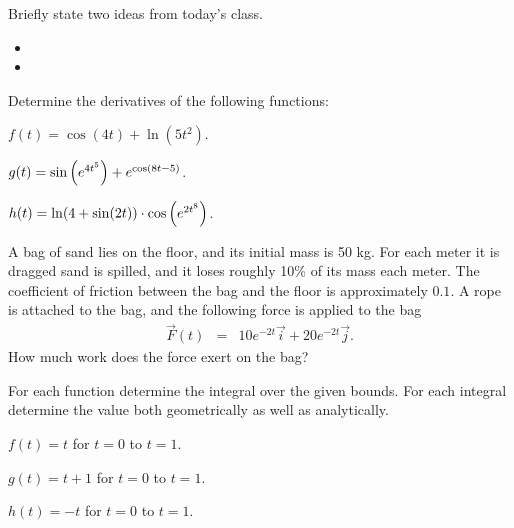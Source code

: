 \begin{problem}
\item Briefly state two ideas from today's class.
  \begin{itemize}
  \item
  \item
  \end{itemize}
\item Determine the derivatives of the following functions:
  \begin{subproblem}
  \item $f(t) = \cos(4t) + \ln(5t^2)$.
    \vfill
  \item $g(t) = \sin\left( e^{4t^5} \right)  + e^{\cos\left( 8t-5 \right)}$.
    \vfill
  \item $h(t) = \ln(4+\sin(2t) ) \cdot \cos \left( e^{2t^8} \right)$.
    \vfill
  \end{subproblem}

  \clearpage

\item A bag of sand lies on the floor, and its initial mass is 50
  kg. For each meter it is dragged sand is spilled, and it loses
  roughly 10\% of its mass each meter. The coefficient of friction
  between the bag and the floor is approximately $0.1$. A rope is
  attached to the bag, and the following force is applied to the bag
  \begin{eqnarray*}
    \vec{F}(t) & = & 10e^{-2t} \vec{i} + 20 e^{-2t} \vec{j}.
  \end{eqnarray*}
  How much work does the force exert on the bag?

  \vfill


\end{problem}



\begin{problem}
\item For each function determine the integral over the given bounds.
  For each integral determine the value both geometrically as well as
  analytically. 
  \begin{subproblem}
  \item $f(t)=t$ for $t=0$ to $t=1$.
    \vfill
  \item $g(t)=t+1$ for $t=0$ to $t=1$.
    \vfill
  \item $h(t)=-t$ for $t=0$ to $t=1$.
    \vfill
  \end{subproblem}
\end{problem}


